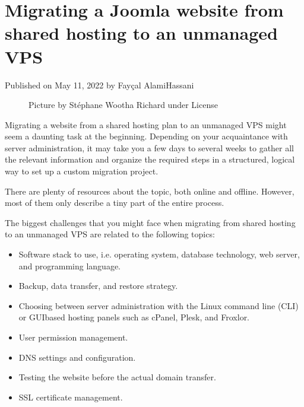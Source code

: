 \documentclass[letterpaper,10pt,english]{sphinxmanual}
\begin{document}
\sphinxstepscope


\chapter{Migrating a Joomla website from shared hosting to an unmanaged VPS}
\label{\detokenize{joomla-to-vps:migrating-a-joomla-website-from-shared-hosting-to-an-unmanaged-vps}}\label{\detokenize{joomla-to-vps::doc}}
\sphinxAtStartPar
Published on May 11, 2022 by Fayçal Alami\sphinxhyphen{}Hassani 

\begin{figure}[htbp]
\centering
\capstart

\noindent{}
\caption{Picture by Stéphane Wootha Richard under  License}\label{\detokenize{joomla-to-vps:id1}}\end{figure}

\sphinxAtStartPar
Migrating a website from a shared hosting plan to an unmanaged VPS might seem a daunting task at the beginning. Depending on your acquaintance with server administration, it may take you a few days to several weeks to gather all the relevant information and organize the required steps in a structured, logical way to set up a custom migration project.

\sphinxAtStartPar
There are plenty of resources about the topic, both online and offline. However, most of them only describe a tiny part of the entire process.

\sphinxAtStartPar
The biggest challenges that you might face when migrating from shared hosting to an unmanaged VPS are related to the following topics:
\begin{itemize}
\item {} 
\sphinxAtStartPar
Software stack to use, i.e. operating system, database technology, web server, and programming language.

\item {} 
\sphinxAtStartPar
Backup, data transfer, and restore strategy.

\item {} 
\sphinxAtStartPar
Choosing between server administration with the Linux command line (CLI) or GUI\sphinxhyphen{}based hosting panels such as cPanel, Plesk, and Froxlor.

\item {} 
\sphinxAtStartPar
User permission management.

\item {} 
\sphinxAtStartPar
DNS settings and configuration.

\item {} 
\sphinxAtStartPar
Testing the website before the actual domain transfer.

\item {} 
\sphinxAtStartPar
SSL certificate management.

\end{itemize}
\end{document}
